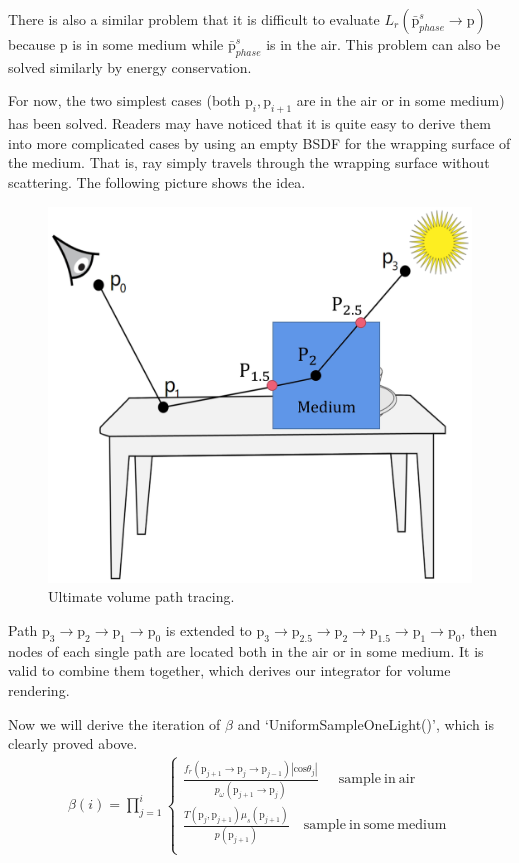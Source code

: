 \documentclass[acmtog]{acmart}
\def\w{\omega}
\def\p{\mathrm{p}}
\begin{document}
There is also a similar problem that it is difficult to evaluate $L_r(\bar{\p}^s_{phase}\rightarrow\p)$ because $\p$ is in some medium while $\bar{\p}^s_{phase}$ is in the air.
This problem can also be solved similarly by energy conservation.\par
For now, the two simplest cases (both $\p_i,\p_{i+1}$ are in the air or in some medium) has been solved.
Readers may have noticed that it is quite easy to derive them into more complicated cases by using an empty BSDF for the wrapping surface of the medium.
That is, ray simply travels through the wrapping surface without scattering.
The following picture shows the idea.
\begin{figure}[H]
	\includegraphics[scale=0.045]{pictures/volume path tracing ultimate.jpg}
	\centering
	\caption{Ultimate volume path tracing.}
\end{figure}
Path $\p_3\rightarrow\p_2\rightarrow\p_1\rightarrow\p_0$ is extended to $\p_3\rightarrow\p_{2.5}\rightarrow\p_2\rightarrow\p_{1.5}\rightarrow\p_1\rightarrow\p_0$, 
then nodes of each single path are located both in the air or in some medium.
It is valid to combine them together, which derives our integrator for volume rendering.\par
Now we will derive the iteration of $\beta$ and `UniformSampleOneLight()', which is clearly proved above.
\begin{equation} \label{eq17}
	\begin{split}
		\beta(i) = \prod_{j=1}^{i}
		\left\{\begin{aligned}
			\frac{f_r(\p_{j+1}\rightarrow\p_{j}\rightarrow\p_{j-1})|\mathrm{cos}\theta_j|}{p_\w(\p_{j+1}\rightarrow\p_j)}\quad\ \ \mathrm{sample\ in\ air}\\
			\frac{T(\p_j,\p_{j+1})\mu_s(\p_{j+1})}{p({\p_{j+1}})}\quad \mathrm{sample\ in\ some\ medium}\\
		\end{aligned}\right.\\
	\end{split}
\end{equation}
\end{document}
